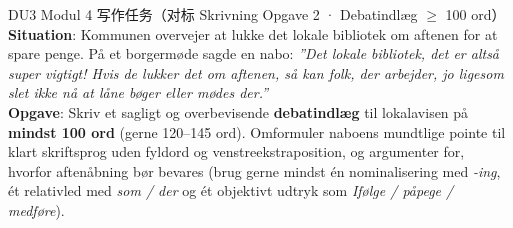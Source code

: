 \begin{emailbox}{DU3 Modul 4 写作任务（对标 Skrivning Opgave 2 · Debatindlæg $\ge$ 100 ord）}
\textbf{Situation}: Kommunen overvejer at lukke det lokale bibliotek om aftenen for at spare penge. På et borgermøde sagde en nabo: \textit{”Det lokale bibliotek, det er altså super vigtigt! Hvis de lukker det om aftenen, så kan folk, der arbejder, jo ligesom slet ikke nå at låne bøger eller mødes der.”}\\
\textbf{Opgave}: Skriv et sagligt og overbevisende \textbf{debatindlæg} til lokalavisen på \textbf{mindst 100 ord} (gerne 120--145 ord). Omformuler naboens mundtlige pointe til klart skriftsprog uden fyldord og venstreekstraposition, og argumenter for, hvorfor aftenåbning bør bevares (brug gerne mindst én nominalisering med \textit{-ing}, ét relativled med \textit{som / der} og ét objektivt udtryk som \textit{Ifølge / påpege / medføre}).
\end{emailbox}

